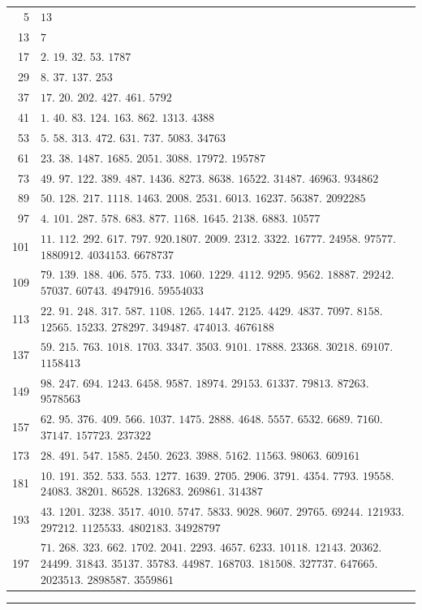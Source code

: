 \par\medskip\begingroup\small\setlength{\tabcolsep}{5pt}
\begin{longtable}{@{}r|p{\dimexpr\linewidth-38pt\relax}@{}}
5 & $13$\\
13 & $7$\\
17 & $2$. $19$. $32$. $53$. $1787$\\
29 & $8$. $37$. $137$. $253$\\
37 & $17$. $20$. $202$. $427$. $461$. $5792$\\
41 & $1$. $40$. $83$. $124$. $163$. $862$. $1313$. $4388$\\
53 & $5$. $58$. $313$. $472$. $631$. $737$. $5083$. $34763$\\
61 & $23$. $38$. $1487$. $1685$. $2051$. $3088$. $17972$. $195787$\\
73 & $49$. $97$. $122$. $389$. $487$. $1436$. $8273$. $8638$. $16522$. $31487$. $46963$. $934862$\\
89 & $50$. $128$. $217$. $1118$. $1463$. $2008$. $2531$. $6013$. $16237$. $56387$. $2092285$\\
97 & $4$. $101$. $287$. $578$. $683$. $877$. $1168$. $1645$. $2138$. $6883$. $10577$\\
101 & $11$. $112$. $292$. $617$. $797$. $920$.$1807$. $2009$. $2312$. $3322$. $16777$. $24958$. $97577$. $1880912$. $4034153$. $6678737$\\
109 & $79$. $139$. $188$. $406$. $575$. $733$. $1060$. $1229$. $4112$. $9295$. $9562$. $18887$. $29242$. $57037$. $60743$. $4947916$. $59554033$\\
113 & $22$. $91$. $248$. $317$. $587$. $1108$. $1265$. $1447$. $2125$. $4429$. $4837$. $7097$. $8158$. $12565$. $15233$. $278297$. $349487$. $474013$. $4676188$\\
137 & $59$. $215$. $763$. $1018$. $1703$. $3347$. $3503$. $9101$. $17888$. $23368$. $30218$. $69107$. $1158413$\\
149 & $98$. $247$. $694$. $1243$. $6458$. $9587$. $18974$. $29153$. $61337$. $79813$. $87263$. $9578563$\\
157 & $62$. $95$. $376$. $409$. $566$. $1037$. $1475$. $2888$. $4648$. $5557$. $6532$. $6689$. $7160$. $37147$. $157723$. $237322$\\
173 & $28$. $491$. $547$. $1585$. $2450$. $2623$. $3988$. $5162$. $11563$. $98063$. $609161$\\
181 & $10$. $191$. $352$. $533$. $553$. $1277$. $1639$. $2705$. $2906$. $3791$. $4354$. $7793$. $19558$. $24083$. $38201$. $86528$. $132683$. $269861$. $314387$\\
193 & $43$. $1201$. $3238$. $3517$. $4010$. $5747$. $5833$. $9028$. $9607$. $29765$. $69244$. $121933$. $297212$. $1125533$. $4802183$. $34928797$\\
197 & $71$. $268$. $323$. $662$. $1702$. $2041$. $2293$. $4657$. $6233$. $10118$. $12143$. $20362$. $24499$. $31843$. $35137$. $35783$. $44987$. $168703$. $181508$. $327737$. $647665$. $2023513$. $2898587$. $3559861$\\
\end{longtable}\endgroup
\par\medskip\begin{center}\rule{0.25\linewidth}{0.3pt}\end{center}
